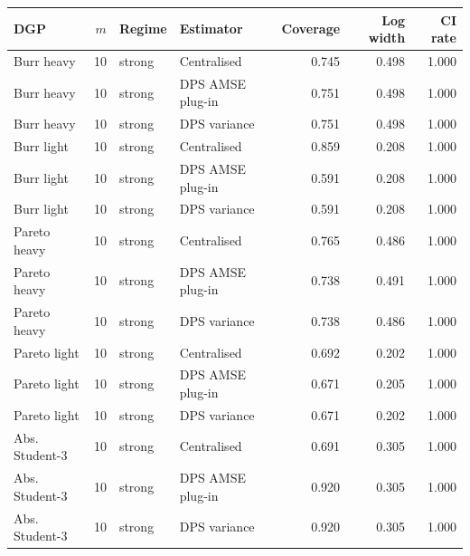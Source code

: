 \begin{tabular}{lrllrrr}
\toprule
DGP & $m$ & Regime & Estimator & Coverage & Log width & CI rate \\
\midrule
Burr heavy & 10 & strong & Centralised & 0.745 & 0.498 & 1.000 \\
Burr heavy & 10 & strong & DPS AMSE plug-in & 0.751 & 0.498 & 1.000 \\
Burr heavy & 10 & strong & DPS variance & 0.751 & 0.498 & 1.000 \\
Burr light & 10 & strong & Centralised & 0.859 & 0.208 & 1.000 \\
Burr light & 10 & strong & DPS AMSE plug-in & 0.591 & 0.208 & 1.000 \\
Burr light & 10 & strong & DPS variance & 0.591 & 0.208 & 1.000 \\
Pareto heavy & 10 & strong & Centralised & 0.765 & 0.486 & 1.000 \\
Pareto heavy & 10 & strong & DPS AMSE plug-in & 0.738 & 0.491 & 1.000 \\
Pareto heavy & 10 & strong & DPS variance & 0.738 & 0.486 & 1.000 \\
Pareto light & 10 & strong & Centralised & 0.692 & 0.202 & 1.000 \\
Pareto light & 10 & strong & DPS AMSE plug-in & 0.671 & 0.205 & 1.000 \\
Pareto light & 10 & strong & DPS variance & 0.671 & 0.202 & 1.000 \\
Abs. Student-3 & 10 & strong & Centralised & 0.691 & 0.305 & 1.000 \\
Abs. Student-3 & 10 & strong & DPS AMSE plug-in & 0.920 & 0.305 & 1.000 \\
Abs. Student-3 & 10 & strong & DPS variance & 0.920 & 0.305 & 1.000 \\
\bottomrule
\end{tabular}

